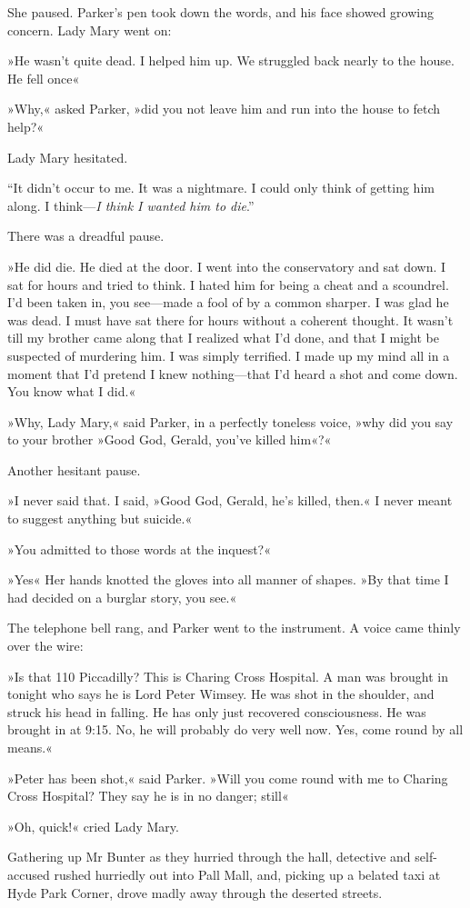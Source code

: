 She paused. Parker's pen took down the words, and his face showed growing concern. Lady Mary went on:

»He wasn't quite dead. I helped him up. We struggled back nearly to the house. He fell once\longdash«

»Why,« asked Parker, »did you not leave him and run into the house to fetch help?«

Lady Mary hesitated.

\enquote{It didn't occur to me. It was a nightmare. I could only think of getting him along. I think---\textit{I think I wanted him to die}.}

There was a dreadful pause.

»He did die. He died at the door. I went into the conservatory and sat down. I sat for hours and tried to think. I hated him for being a cheat and a scoundrel. I'd been taken in, you see\allowbreak---\allowbreak made a fool of by a common sharper. I was glad he was dead. I must have sat there for hours without a coherent thought. It wasn't till my brother came along that I realized what I'd done, and that I might be suspected of murdering him. I was simply terrified. I made up my mind all in a moment that I'd pretend I knew nothing\allowbreak---\allowbreak that I'd heard a shot and come down. You know what I did.«

»Why, Lady Mary,« said Parker, in a perfectly toneless voice, »why did you say to your brother »Good God, Gerald, you've killed him«?«

Another hesitant pause.

»I never said that. I said, »Good God, Gerald, he's killed, then.« I never meant to suggest anything but suicide.«

»You admitted to those words at the inquest?«

»Yes\longdash« Her hands knotted the gloves into all manner of shapes. »By that time I had decided on a burglar story, you see.«

The telephone bell rang, and Parker went to the instrument. A voice came thinly over the wire:

»Is that 110 Piccadilly? This is Charing Cross Hospital. A man was brought in tonight who says he is Lord Peter Wimsey. He was shot in the shoulder, and struck his head in falling. He has only just recovered consciousness. He was brought in at 9:15. No, he will probably do very well now. Yes, come round by all means.«

»Peter has been shot,« said Parker. »Will you come round with me to Charing Cross Hospital? They say he is in no danger; still\longdash«

»Oh, quick!« cried Lady Mary.

Gathering up Mr Bunter as they hurried through the hall, detective and self-accused rushed hurriedly out into Pall Mall, and, picking up a belated taxi at Hyde Park Corner, drove madly away through the deserted streets.
